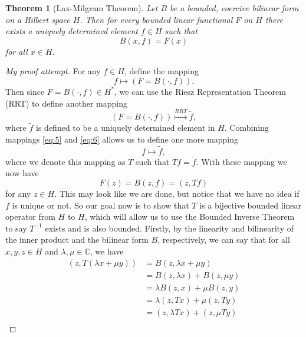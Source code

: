 \documentclass[11pt]{article}
\newtheorem{theorem}{Theorem}
\theoremstyle{definition}
\begin{document}
\begin{theorem}[Lax-Milgram Theorem]
	Let $B$ be a bounded, coercive bilinear form on a Hilbert space $H$. Then for every bounded linear functional $F$ on $H$
	there exists a uniquely determined element $f\in H$ such that
	\begin{equation*}
		B(x,f) = F(x)
	\end{equation*}
	for all $x \in H$.
\end{theorem}
\begin{proof}[My proof attempt]
	For any $f \in H$, define the mapping 
	\begin{equation}
		\label{eq:5}
		f \mapsto (F = B(\cdot, f)).
	\end{equation}
	Then since $F = B(\cdot, f) \in H^*$, we can use the Riesz Representation Theorem (RRT) to  define another mapping
	\begin{equation}
		\label{eq:6}
		(F = B(\cdot,f)) \stackrel{RRT}{\mapsto} \tilde{f},
	\end{equation}
	where $\tilde{f}$ is defined to be a uniquely determined element in $H$.
	Combining mappings \ref{eq:5} and \ref{eq:6} allows us to define one more mapping
	\begin{equation}
		\label{eq:7}
		f \mapsto \tilde{f},
	\end{equation}
	where we denote this mapping as $T$ such that $Tf = \tilde{f}$.
	With these mapping we now have
	\begin{equation*}
		F(z) = B(z,f) = (z,Tf)
	\end{equation*}
	for any $z \in H$.
	This may look like we are done, but notice that we have no idea if $f$ is unique or not.
	So our goal now is to show that $T$ is a bijective bounded linear operator from $H$ to $H$,
	which will allow us to use the Bounded Inverse Theorem to say $T^{-1}$ exists and is also bounded.
	Firstly, by the linearity and bilinearity of the inner product and the bilinear form $B$, respectively,
	we can say that for all $x,y,z \in H$ and $\lambda, \mu \in \mathbb{C}$, we have
	\begin{equation*}
		\begin{aligned}
			(z,T(\lambda x + \mu y)) &= B(z, \lambda x + \mu y) \\
						 &= B(z,\lambda x) + B(z, \mu y) \\
						 &= \lambda B(z,x) + \mu B(z,y) \\
						 &= \lambda (z,Tx) + \mu (z,Ty) \\
						 &= (z,\lambda Tx) + (z, \mu Ty) \\

\end{aligned}
\end{equation*}
\end{proof}
\end{document}
